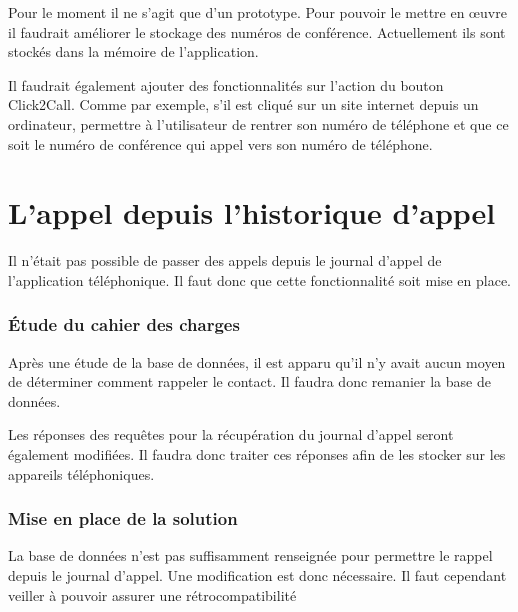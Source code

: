 Pour le moment il ne s'agit que d'un prototype. Pour pouvoir le mettre en œuvre il faudrait améliorer le stockage des numéros de conférence. Actuellement ils sont stockés dans la mémoire de l'application.

Il faudrait également ajouter des fonctionnalités sur l'action du bouton Click2Call. Comme par exemple, s'il est cliqué sur un site internet depuis un ordinateur, permettre à l'utilisateur de rentrer son numéro de téléphone et que ce soit le numéro de conférence qui appel vers son numéro de téléphone.

\section{L'appel depuis l'historique d'appel}

Il n'était pas possible de passer des appels depuis le journal d'appel de l'application téléphonique. Il faut donc que cette fonctionnalité soit mise en place.

\subsubsection{Étude du cahier des charges}

Après une étude de la base de données, il est apparu qu'il n'y avait aucun moyen de déterminer comment rappeler le contact. Il faudra donc remanier la base de données. 

Les réponses des requêtes pour la récupération du journal d'appel seront également modifiées. Il faudra donc traiter ces réponses afin de les stocker sur les appareils téléphoniques. 

\subsubsection{Mise en place de la solution}

La base de données n'est pas suffisamment renseignée pour permettre le rappel depuis le journal d'appel. Une modification est donc nécessaire. Il faut cependant veiller à pouvoir assurer une rétrocompatibilité  